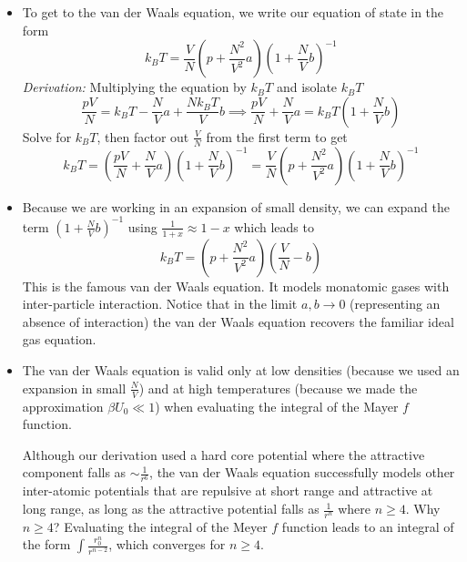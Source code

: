 \documentclass[11pt, a4paper]{article}
\begin{document}
\begin{itemize}
	\item To get to the van der Waals equation, we write our equation of state in the form 
	\begin{equation*}
		k_{B}T = \frac{V}{N}\left(p + \frac{N^{2}}{V^{2}}a\right)\left(1 + \frac{N}{V}b\right)^{-1}
	\end{equation*}
	\textit{Derivation:} Multiplying the equation by $ k_{B}T $ and isolate $ k_{B}T $
	\begin{equation*}
		\frac{pV}{N} = k_{B}T - \frac{N}{V}a + \frac{Nk_{B}T}{V}b \implies \frac{pV}{N} + \frac{N}{V}a = k_{B}T\left(1 + \frac{N}{V}b\right)
	\end{equation*}
	Solve for $ k_{B}T $, then factor out $ \frac{V}{N} $ from the first term to get
	\begin{equation*}
		k_{B}T = \left(\frac{pV}{N} + \frac{N}{V}a\right)\left(1 + \frac{N}{V}b\right)^{-1} = \frac{V}{N}\left(p + \frac{N^{2}}{V^{2}}a\right)\left(1 + \frac{N}{V}b\right)^{-1}
	\end{equation*}
	
	
	
	\item Because we are working in an expansion of small density, we can expand the term $ \left(1 + \frac{N}{V}b\right)^{-1} $ using $ \frac{1}{1+x} \approx 1 - x $ which leads to
	\begin{equation*}
		k_{B}T = \left(p + \frac{N^{2}}{V^{2}}a\right)\left(\frac{V}{N} - b\right)
	\end{equation*}
	This is the famous van der Waals equation. It models monatomic gases with inter-particle interaction. Notice that in the limit $ a, b \to 0 $ (representing an absence of interaction) the van der Waals equation recovers the familiar ideal gas equation.
	
	\iffalse
	\item The van der Waals equation is valid only at low densities (because we used an expansion in small $ \frac{N}{V} $) and at high temperatures (because we made the approximation $ \beta U_{0} \ll 1 $) when evaluating the integral of the Mayer $ f $ function.
	
	Although our derivation used a hard core potential where the attractive component falls as $ \sim \frac{1}{r^{6}} $, the van der Waals equation successfully models other inter-atomic potentials that are repulsive at short range and attractive at long range, as long as the attractive potential falls as $ \frac{1}{r^{n}} $ where $ n \geq 4 $. Why $ n \geq 4 $? Evaluating the integral of the Meyer $ f $ function leads to an integral of the form $ \int \frac{r_{0}^{n}}{r^{n-2}} $, which converges for $ n \geq 4 $.
	

\end{itemize}
\end{document}
